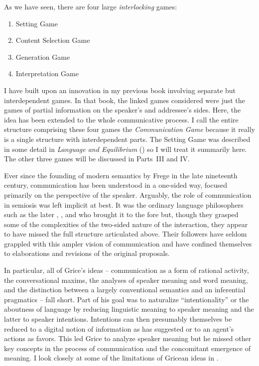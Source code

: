 As we have seen, there are four large \emph{interlocking} games:

\begin{enumerate}
\item Setting Game
\item Content Selection Game
\item Generation Game
\item Interpretation Game
\end{enumerate}

I have built upon an innovation in my previous book involving separate but interdependent games. In that book, the linked games considered were just the games of partial information on the speaker's and addressee's sides. Here, the idea has been extended to the whole communicative process. I call the entire structure comprising these four games the \emph{Communication Game} because it really is a single structure with interdependent parts. The Setting Game was described in some detail in \emph{Language and Equilibrium} (\citeyear[Chapter~3]{parikh:le}) so I will treat it summarily here. The other three games will be discussed in Parts~\textrm{III} and \textrm{IV}.

Ever since the founding of modern semantics by Frege in the late nineteenth century, communication has been understood in a one-sided way, focused primarily on the perspective of the speaker. Arguably, the role of communication in semiosis was left implicit at best. It was the ordinary language philosophers such as the later \citet{wittgenstein:pi}, \citet{austin:pp, austin:htdtww}, and \citet{grice:sitwow} who brought it to the fore but, though they grasped some of the complexities of the two-sided nature of the interaction, they appear to have missed the full structure articulated above. Their followers have seldom grappled with this ampler vision of communication and have confined themselves to elaborations and revisions of the original proposals.

In particular, all of Grice's ideas -- communication as a form of rational activity, the conversational maxims, the analyses of speaker meaning and word meaning, and the distinction between a largely conventional semantics and an inferential pragmatics -- fall short. Part of his goal was to naturalize ``intentionality'' or the aboutness of language by reducing linguistic meaning to speaker meaning and the latter to speaker intentions. Intentions can then presumably themselves be reduced to a digital notion of information as \citet{dretske:kfi} has suggested or to an agent's actions as \citet{stalnaker:inquiry} favors. This led Grice to analyze speaker meaning but he missed other key concepts in the process of communication and the concomitant emergence of meaning. I look closely at some of the limitations of Gricean ideas in .

